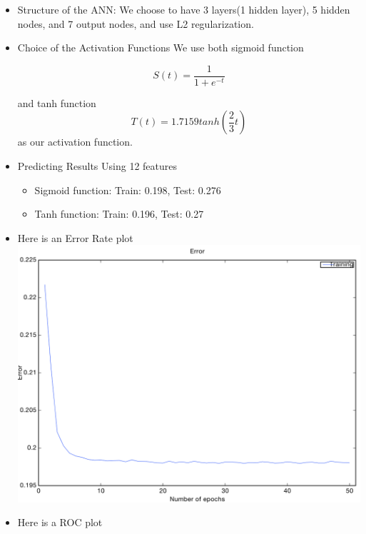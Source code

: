 \documentclass[11pt]{article}  %
\begin{document}
\begin{itemize}
\item Structure of the ANN:
We choose to have 3 layers(1 hidden layer), 5 hidden nodes, and 7 output nodes, and use L2 regularization.
\item Choice of the Activation Functions
We use both sigmoid function 

\begin{equation}
S(t) = \frac{1}{1 + e^{-t}}
\end{equation}

and tanh function 
\begin{equation}
T(t) = 1.7159tanh(\frac{2}{3}t)
\end{equation}
as our activation function.
\item Predicting Results Using 12 features
\begin{itemize}

\item Sigmoid function: Train: 0.198, Test: 0.276

\item Tanh function: Train: 0.196, Test: 0.27

\end{itemize}
\item Here is an Error Rate plot\\
\includegraphics[scale=0.4]{3-5-7With12Error}

\item Here is a ROC plot\\





\end{itemize}
\end{document}
